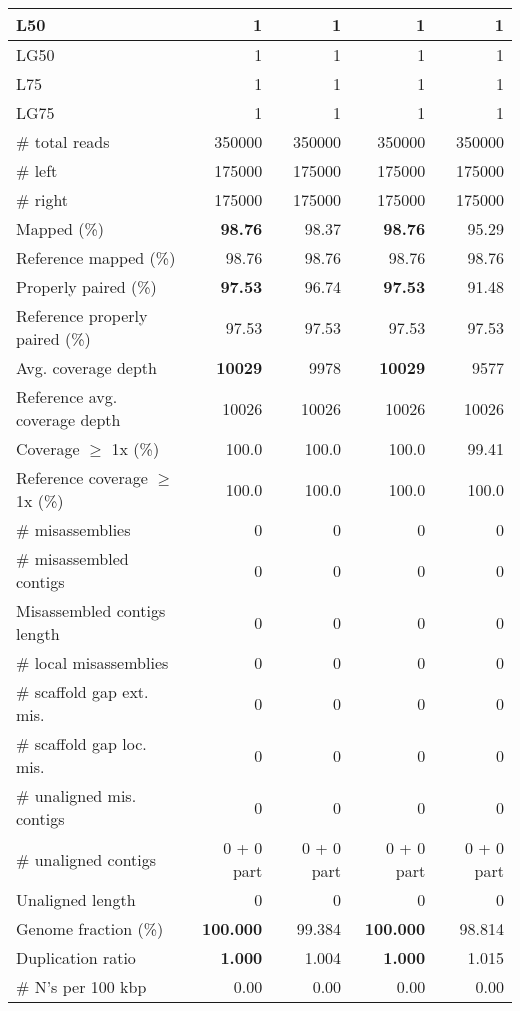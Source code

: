 \documentclass[12pt,a4paper]{article}
\begin{document}
\begin{table}[ht]
\begin{center}
\begin{tabular}{|l*{4}{|r}|}
L50 & 1 & 1 & 1 & 1 \\ \hline
LG50 & 1 & 1 & 1 & 1 \\ \hline
L75 & 1 & 1 & 1 & 1 \\ \hline
LG75 & 1 & 1 & 1 & 1 \\ \hline
\# total reads & 350000 & 350000 & 350000 & 350000 \\ \hline
\# left & 175000 & 175000 & 175000 & 175000 \\ \hline
\# right & 175000 & 175000 & 175000 & 175000 \\ \hline
Mapped (\%) & {\bf 98.76} & 98.37 & {\bf 98.76} & 95.29 \\ \hline
Reference mapped (\%) & 98.76 & 98.76 & 98.76 & 98.76 \\ \hline
Properly paired (\%) & {\bf 97.53} & 96.74 & {\bf 97.53} & 91.48 \\ \hline
Reference properly paired (\%) & 97.53 & 97.53 & 97.53 & 97.53 \\ \hline
Avg. coverage depth & {\bf 10029} & 9978 & {\bf 10029} & 9577 \\ \hline
Reference avg. coverage depth & 10026 & 10026 & 10026 & 10026 \\ \hline
Coverage $\geq$ 1x (\%) & 100.0 & 100.0 & 100.0 & 99.41 \\ \hline
Reference coverage $\geq$ 1x (\%) & 100.0 & 100.0 & 100.0 & 100.0 \\ \hline
\# misassemblies & 0 & 0 & 0 & 0 \\ \hline
\# misassembled contigs & 0 & 0 & 0 & 0 \\ \hline
Misassembled contigs length & 0 & 0 & 0 & 0 \\ \hline
\# local misassemblies & 0 & 0 & 0 & 0 \\ \hline
\# scaffold gap ext. mis. & 0 & 0 & 0 & 0 \\ \hline
\# scaffold gap loc. mis. & 0 & 0 & 0 & 0 \\ \hline
\# unaligned mis. contigs & 0 & 0 & 0 & 0 \\ \hline
\# unaligned contigs & 0 + 0 part & 0 + 0 part & 0 + 0 part & 0 + 0 part \\ \hline
Unaligned length & 0 & 0 & 0 & 0 \\ \hline
Genome fraction (\%) & {\bf 100.000} & 99.384 & {\bf 100.000} & 98.814 \\ \hline
Duplication ratio & {\bf 1.000} & 1.004 & {\bf 1.000} & 1.015 \\ \hline
\# N's per 100 kbp & 0.00 & 0.00 & 0.00 & 0.00 \\ \hline

\end{tabular}
\end{center}
\end{table}
\end{document}
